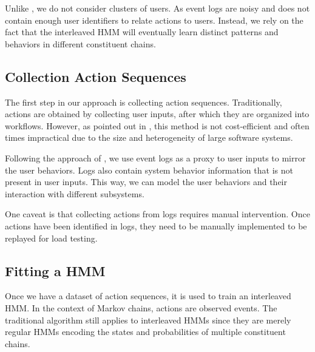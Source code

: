 Unlike \cite{Chen2019-fu}, we do not consider clusters of users. As event logs are noisy and does not contain enough user identifiers \cite{Zhao2023-nh} to relate actions to users. Instead, we rely on the fact that the interleaved HMM will eventually learn distinct patterns and behaviors in different constituent chains.


\subsection{Collection Action Sequences}

The first step in our approach is collecting action sequences. Traditionally, actions are obtained by collecting user inputs, after which they are organized into workflows. However, as pointed out in \cite{Chen2019-fu}, this method is not cost-efficient and often times impractical due to the size and heterogeneity of large software systems.

Following the approach of \cite{Chen2019-fu}, we use event logs as a proxy to user inputs to mirror the user behaviors. Logs also contain system behavior information that is not present in user inputs. This way, we can model the user behaviors and their interaction with different subsystems.

One caveat is that collecting actions from logs requires manual intervention. Once actions have been identified in logs, they need to be manually implemented to be replayed for load testing.

\subsection{Fitting a HMM}

Once we have a dataset of action sequences, it is used to train an interleaved HMM. In the context of Markov chains, actions are observed events.
The traditional algorithm still applies to interleaved HMMs since they are merely regular HMMs encoding the states and probabilities of multiple constituent chains.

